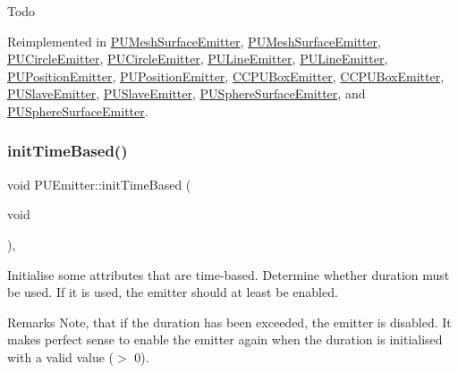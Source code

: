 Todo 

Reimplemented in \hyperlink{classPUMeshSurfaceEmitter_a868c19220258dc73548b344edd8f3e18}{P\+U\+Mesh\+Surface\+Emitter}, \hyperlink{classPUMeshSurfaceEmitter_a9696ca685d847e4e3c4f403e66f95ecb}{P\+U\+Mesh\+Surface\+Emitter}, \hyperlink{classPUCircleEmitter_a29bb94b8103ac04b51b65ca4780ce490}{P\+U\+Circle\+Emitter}, \hyperlink{classPUCircleEmitter_ae5f34473b3fc262944ed96489a5ed5ce}{P\+U\+Circle\+Emitter}, \hyperlink{classPULineEmitter_af448c4a0d07befdcdd1d28d7fddacb03}{P\+U\+Line\+Emitter}, \hyperlink{classPULineEmitter_a45329bb73318a8b5c356e7ae3ce0da95}{P\+U\+Line\+Emitter}, \hyperlink{classPUPositionEmitter_a6e2e82f753f3339a4981f3c8d80d1b48}{P\+U\+Position\+Emitter}, \hyperlink{classPUPositionEmitter_ab23517a23c156545d99238298b3ac0c6}{P\+U\+Position\+Emitter}, \hyperlink{classCCPUBoxEmitter_a405d3a333bd6e513a38f1b318163f969}{C\+C\+P\+U\+Box\+Emitter}, \hyperlink{classCCPUBoxEmitter_ad3f50a904d4f27ce0b40d5e9ccfad9c9}{C\+C\+P\+U\+Box\+Emitter}, \hyperlink{classPUSlaveEmitter_a8498d171d9db253b48e103c9946abba3}{P\+U\+Slave\+Emitter}, \hyperlink{classPUSlaveEmitter_a91be8151129e78b9a1a06a67ff67c640}{P\+U\+Slave\+Emitter}, \hyperlink{classPUSphereSurfaceEmitter_a03a5b2d1d21c867c4f22a127555eeb46}{P\+U\+Sphere\+Surface\+Emitter}, and \hyperlink{classPUSphereSurfaceEmitter_aa727aa40576357ab1e2577ae9e47937a}{P\+U\+Sphere\+Surface\+Emitter}.

\mbox{\label{classPUEmitter_a20336349505af1844784d9a075013bd4}} 
\subsubsection{\texorpdfstring{init\+Time\+Based()}{initTimeBased()}\hspace{0.1cm}{\footnotesize\ttfamily [1/2]}}
{\footnotesize\ttfamily void P\+U\+Emitter\+::init\+Time\+Based (\begin{DoxyParamCaption}\item[{void}]{ }\end{DoxyParamCaption})\hspace{0.3cm}{\ttfamily [inline]}, {\ttfamily [protected]}}

Initialise some attributes that are time-\/based. Determine whether duration must be used. If it is used, the emitter should at least be enabled. \begin{DoxyRemark}{Remarks}
Note, that if the duration has been exceeded, the emitter is disabled. It makes perfect sense to enable the emitter again when the duration is initialised with a valid value ($>$ 0).
\end{DoxyRemark}
\mbox{\label{classPUEmitter_a20336349505af1844784d9a075013bd4}} 
